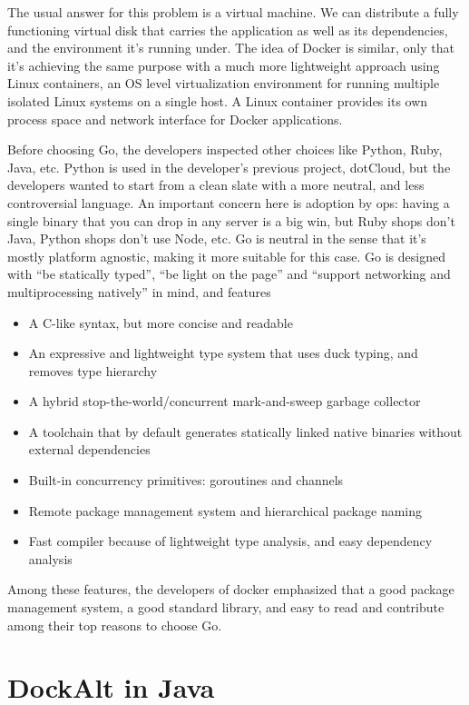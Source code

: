\documentclass[letterpaper,twocolumn,10pt]{article}
\begin{document}
The usual answer for this problem is a virtual machine. We can distribute a fully functioning virtual disk that carries the application as well as its dependencies, and the environment it's running under. The idea of Docker is similar, only that it's achieving the same purpose with a much more lightweight approach using Linux containers, an OS level virtualization environment for running multiple isolated Linux systems on a single host. A Linux container provides its own process space and network interface for Docker applications. \cite{LXC} \cite{DockerGithub}

Before choosing Go, the developers inspected other choices like Python, Ruby, Java, etc. Python is used in the developer's previous project, dotCloud, but the developers wanted to start from a clean slate with a more neutral, and less controversial language. An important concern here is adoption by ops: having a single binary that you can drop in any server is a big win, but Ruby shops don't Java, Python shops don't use Node, etc. Go is neutral in the sense that it's mostly platform agnostic, making it more suitable for this case. Go is designed with ``be statically typed'', ``be light on the page'' and ``support networking and multiprocessing natively'' in mind, and features \cite{GoSite} \cite{GoWikipedia}
\begin{itemize}
\item A C-like syntax, but more concise and readable
\item An expressive and lightweight type system that uses duck typing, and removes type hierarchy
\item A hybrid stop-the-world/concurrent mark-and-sweep garbage collector
\item A toolchain that by default generates statically linked native binaries without external dependencies
\item Built-in concurrency primitives: goroutines and channels
\item Remote package management system and hierarchical package naming
\item Fast compiler because of lightweight type analysis, and easy dependency analysis
\end{itemize}
Among these features, the developers of docker emphasized that a good package management system, a good standard library, and easy to read and contribute among their top reasons to choose Go. \cite{GopherCon2014}

\section{DockAlt in Java}
\end{document}
